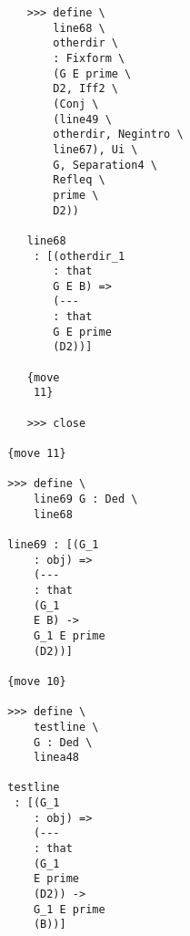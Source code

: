 \documentclass[12pt]{article}
\begin{document}
\begin{verbatim}
                                    >>> define \
                                        line68 \
                                        otherdir \
                                        : Fixform \
                                        (G E prime \
                                        D2, Iff2 \
                                        (Conj \
                                        (line49 \
                                        otherdir, Negintro \
                                        line67), Ui \
                                        G, Separation4 \
                                        Refleq \
                                        prime \
                                        D2))

                                    line68 
                                     : [(otherdir_1 
                                        : that 
                                        G E B) => 
                                        (--- 
                                        : that 
                                        G E prime 
                                        (D2))]

                                    {move 
                                     11}

                                    >>> close

                                 {move 11}

                                 >>> define \
                                     line69 G : Ded \
                                     line68

                                 line69 : [(G_1 
                                     : obj) => 
                                     (--- 
                                     : that 
                                     (G_1 
                                     E B) -> 
                                     G_1 E prime 
                                     (D2))]

                                 {move 10}

                                 >>> define \
                                     testline \
                                     G : Ded \
                                     linea48

                                 testline 
                                  : [(G_1 
                                     : obj) => 
                                     (--- 
                                     : that 
                                     (G_1 
                                     E prime 
                                     (D2)) -> 
                                     G_1 E prime 
                                     (B))]


\end{verbatim}
\end{document}
